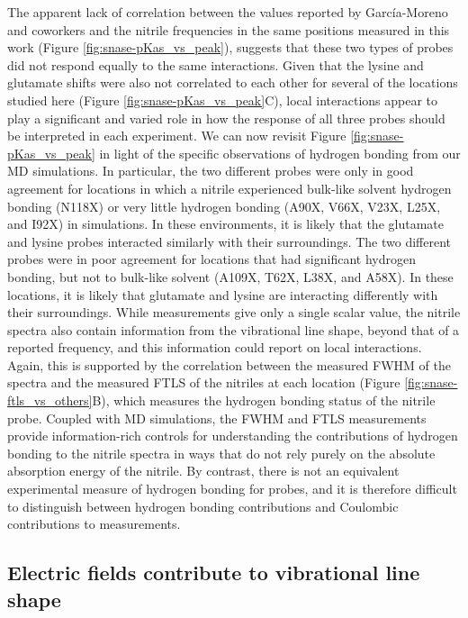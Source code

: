 The apparent lack of correlation between the \dpKa{} values reported by Garc\'ia-Moreno and coworkers and the nitrile frequencies in the same positions measured in this work (Figure \ref{fig:snase-pKas_vs_peak}), suggests that these two types of probes did not respond equally to the same interactions. 
Given that the lysine and glutamate \pKa{} shifts were also not correlated to each other for several of the locations studied here (Figure \ref{fig:snase-pKas_vs_peak}C), local interactions appear to play a significant and varied role in how the response of all three probes should be interpreted in each experiment. 
We can now revisit Figure \ref{fig:snase-pKas_vs_peak} in light of the specific observations of hydrogen bonding from our MD simulations. 
In particular, the two different \pKa{} probes were only in good agreement for locations in which a nitrile experienced bulk-like solvent hydrogen bonding (N118X) or very little hydrogen bonding (A90X, V66X, V23X, L25X, and I92X) in simulations. 
In these environments, it is likely that the glutamate and lysine \pKa{} probes interacted similarly with their surroundings. 
The two different \pKa{} probes were in poor agreement for locations that had significant hydrogen bonding, but not to bulk-like solvent (A109X, T62X, L38X, and A58X). 
In these locations, it is likely that glutamate and lysine are interacting differently with their surroundings. 
While \dpKa{} measurements give only a single scalar value, the nitrile spectra also contain information from the vibrational line shape, beyond that of a reported frequency, and this information could report on local interactions. 
Again, this is supported by the correlation between the measured FWHM of the spectra and the measured FTLS of the nitriles at each location (Figure \ref{fig:snase-ftls_vs_others}B), which measures the hydrogen bonding status of the nitrile probe. 
Coupled with MD simulations, the FWHM and FTLS measurements provide information-rich controls for understanding the contributions of hydrogen bonding to the nitrile spectra in ways that do not rely purely on the absolute absorption energy of the nitrile. 
By contrast, there is not an equivalent experimental measure of hydrogen bonding for \pKa{} probes, and it is therefore difficult to distinguish between hydrogen bonding contributions and Coulombic contributions to \dpKa{} measurements.

\subsection{Electric fields contribute to vibrational line shape}

